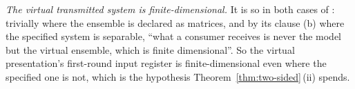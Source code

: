 \begin{remark}
\emph{The virtual transmitted system is finite-dimensional.} It is so in both
cases of : trivially where the ensemble is
declared as matrices, and by its clause (b) where the specified system is
separable, ``what a consumer receives is never the model but the virtual
ensemble, which is finite dimensional''. So the virtual presentation's
first-round input register is finite-dimensional even where the specified one
is not, which is the hypothesis Theorem~\ref{thm:two-sided}\,(ii) spends.
\end{remark}
